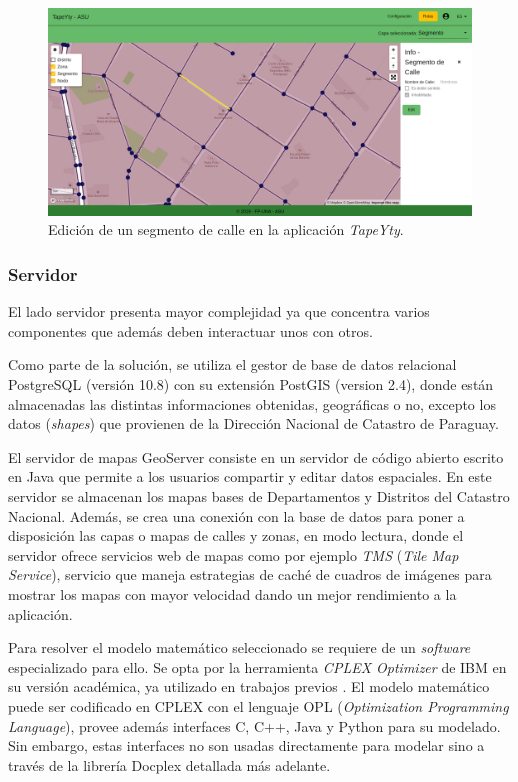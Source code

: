 \begin{figure}[tbp]
\centerline{\includegraphics[width=\textwidth]{20190426_Aplicacion_Rutas.png}}
\caption{Edición de un segmento de calle en la aplicación \textit{TapeYty}.}
\label{fig:aplicacionRutas}
\end{figure}

\subsubsection{Servidor}

El lado servidor presenta mayor complejidad ya que concentra varios componentes que además deben interactuar unos con otros.

Como parte de la solución, se utiliza el gestor de base de datos relacional PostgreSQL (versión 10.8) con su extensión PostGIS (version 2.4), donde están almacenadas las distintas informaciones obtenidas, geográficas o no, excepto los datos (\textit{shapes}) que provienen de la Dirección Nacional de Catastro de Paraguay.

El servidor de mapas GeoServer consiste en un servidor de código abierto escrito en Java que permite a los usuarios compartir y editar datos espaciales. En este servidor se almacenan los mapas bases de Departamentos y Distritos del Catastro Nacional. Además, se crea una conexión con la base de datos para poner a disposición las capas o mapas de calles y zonas, en modo lectura, donde el servidor ofrece servicios web de mapas como por ejemplo \textit{TMS} (\textit{Tile Map Service}), servicio que maneja estrategias de caché de cuadros de imágenes para mostrar los mapas con mayor velocidad dando un mejor rendimiento a la aplicación.

Para resolver el modelo matemático seleccionado se requiere de un \textit{software} especializado para ello. Se opta por la herramienta \textit{CPLEX Optimizer} de IBM en su versión académica, ya utilizado en trabajos previos \citep{Vecchi2016ACollection,Ramos2018TheApproaches,BabaeeTirkolaee2019DevelopingStudy}. El modelo matemático puede ser codificado en CPLEX con el lenguaje OPL ({\textit{Optimization Programming Language}}), provee además interfaces C, C++, Java y Python para su modelado. Sin embargo, estas interfaces no son usadas directamente para modelar sino a través de la librería Docplex detallada más adelante.

